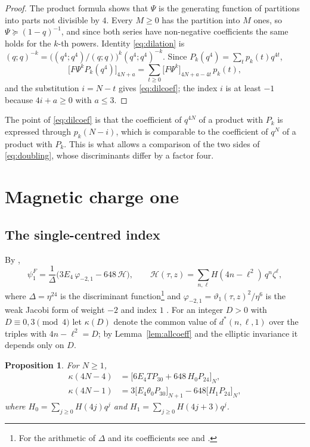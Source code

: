 \documentclass[11pt]{amsart}
\newtheorem{proposition}[theorem]{Proposition}
\theoremstyle{definition}
\newcommand{\vt}{\vartheta}
\newcommand{\coef}[2]{\big[#1\big]_{#2}}
\begin{document}
\begin{proof}
The product formula shows that $\Psi$ is the generating function of partitions into parts not divisible by $4$. Every $M\ge0$ has the partition into $M$ ones, so $\Psi\succeq(1-q)^{-1}$, and since both series have non-negative coefficients the same holds for the $k$-th powers. Identity \eqref{eq:dilation} is $(q;q)^{-k}=\big((q^4;q^4)/(q;q)\big)^k(q^4;q^4)^{-k}$. Since $P_k(q^4)=\sum_tp_k(t)q^{4t}$,
\[
\coef{F\Psi^kP_k(q^4)}{4N+a}=\sum_{t\ge0}\coef{F\Psi^k}{4N+a-4t}\,p_k(t),
\]
and the substitution $i=N-t$ gives \eqref{eq:dilcoef}; the index $i$ is at least $-1$ because $4i+a\ge0$ with $a\le3$.
\end{proof}

The point of \eqref{eq:dilcoef} is that the coefficient of $q^{4N}$ of a product with $P_k$ is expressed through $p_k(N-i)$, which is comparable to the coefficient of $q^N$ of a product with $P_k$. This is what allows a comparison of the two sides of \eqref{eq:doubling}, whose discriminants differ by a factor four.

\section{Magnetic charge one}\label{sec:m1}

\subsection{The single-centred index}
By \cite[(3.6), (4.1)]{BM13},
\begin{equation}\label{eq:psi1F}
\psi_1^F=\frac1\Delta\big(3E_4\,\varphi_{-2,1}-648\,\mathcal H\big),\qquad \mathcal H(\tau,z)=\sum_{n,\ell}H(4n-\ell^2)\,q^n\zeta^\ell,
\end{equation}
where $\Delta=\eta^{24}$ is the discriminant function\footnote{For the arithmetic of $\Delta$ and its coefficients see \cite{Zag08} and \cite{BBS23}.} and $\varphi_{-2,1}=\vt_1(\tau,z)^2/\eta^6$ is the weak Jacobi form of weight $-2$ and index $1$ \cite{EZ85}. For an integer $D>0$ with $D\equiv0,3\pmod4$ let $\kappa(D)$ denote the common value of $d^*(n,\ell,1)$ over the triples with $4n-\ell^2=D$; by Lemma~\ref{lem:allcoeff} and the elliptic invariance it depends only on $D$.

\begin{proposition}\label{prop:m1}
For $N\ge1$,
\begin{align}
\kappa(4N-4)&=\coef{6E_4TP_{30}+648\,H_0P_{24}}{N},\label{eq:kappa0}\\
\kappa(4N-1)&=3\coef{E_4\theta_0P_{30}}{N+1}-648\coef{H_1P_{24}}{N},\label{eq:kappa1}
\end{align}
where $H_0=\sum_{j\ge0}H(4j)q^j$ and $H_1=\sum_{j\ge0}H(4j+3)q^j$.
\end{proposition}
\end{document}
